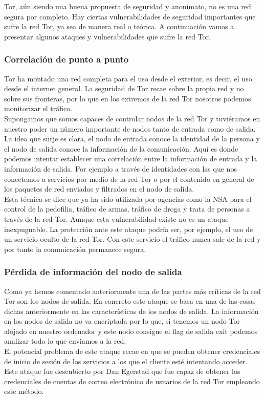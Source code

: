 Tor, aún siendo una buena propuesta de seguridad y anonimato, no es una red segura por completo. Hay ciertas vulnerabilidades de seguridad importantes que sufre la red Tor, ya sea de manera real o teórica. A continuación vamos a presentar algunos ataques y vulnerabilidades que sufre la red Tor.

\subsubsection{Correlación de punto a punto}
Tor ha montado una red completa para el uso desde el exterior, es decir, el uso desde el internet general. La seguridad de Tor recae sobre la propia red y no sobre sus fronteras, por lo que en los extremos de la red Tor nosotros podemos monitorizar el tráfico.\\
Supongamos que somos capaces de controlar nodos de la red Tor y tuviéramos en nuestro poder un número importante de nodos tanto de entrada como de salida. La idea que surje es clara, el nodo de entrada conoce la identidad de la persona y el nodo de salida conoce la información de la comunicación. Aquí es donde podemos intentar establecer una correlación entre la información de entrada y la información de salida. Por ejemplo a través de identidades con las que nos conectemos a servicios por medio de la red Tor o por el contenido en general de los paquetes de red enviados y filtrados en el nodo de salida.\\
Esta técnica se dice que ya ha sido utilizada por agencias como la NSA para el control de la pedofilia, tráfico de armas, tráfico de droga y trata de personas a través de la red Tor. Aunque esta vulnerabilidad existe no es un ataque inexpugnable. La protección ante este ataque podría ser, por ejemplo, el uso de un servicio oculto de la red Tor. Con este servicio el tráfico nunca sale de la red y por tanto la comunicación permanece segura.

\subsubsection{Pérdida de información del nodo de salida}
Como ya hemos comentado anteriormente una de las partes más críticas de la red Tor son los nodos de salida. En concreto este ataque se basa en una de las cosas dichas anteriormente en las características de los nodos de salida. La información en los nodos de salida no va encriptada por lo que, si tenemos un nodo Tor alojado en nuestro ordenador y este nodo consigue el flag de salida exit podemos analizar todo lo que enviamos a la red.\\
El potencial problema de este ataque recae en que se pueden obtener credenciales de inicio de sesión de los servicios a los que el cliente esté intentando acceder. Este ataque fue descubierto por Dan Egerstad que fue capaz de  obtener los credenciales de cuentas de correo electrónico de usuarios de la red Tor empleando este método.

